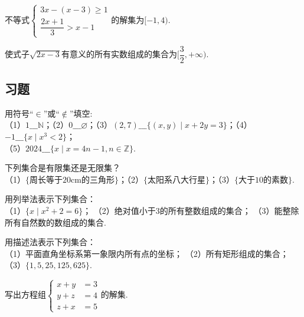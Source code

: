 \documentclass[lang=cn,math=cm,chinesefont=nofont,11pt,scheme=chinese,twocol]{elegantbook}
\begin{document}
\begin{example}
  不等式$\begin{cases}3x-(x-3)\geqslant1\\\dfrac{2x+1}{3}>x-1\end{cases}$的解集为$[-1,4)$.
\end{example}

\begin{example}
  使式子$\sqrt{2x-3}$有意义的所有实数组成的集合为$[\dfrac{3}{2},+\infty)$.
\end{example}

\subsection{习题}

\begin{exercise}\label{exer:1}
  用符号“$\in$”或“$\notin$”填空:\\
（1）$1\_\_\_\mathbb{N}$；（2）$0\_\_\_\varnothing$；（3）$(2,7)\_\_\_\{(x,y)\mid x+2y=3\}$；（4）$-1\_\_\_\{x\mid x^{3}<2\}$；\\（5）$2024\_\_\_\{x\mid x=4n-1,n\in\mathbb{Z}\}$.
\end{exercise}

\begin{exercise}\label{exer:2}
  下列集合是有限集还是无限集？\\
  （1）$\{\text{周长等于20cm的三角形}\}$；（2）$\{\text{太阳系八大行星}\}$；（3）$\{\text{大于10的素数}\}$.
\end{exercise}

\begin{exercise}\label{exer:3}
  用列举法表示下列集合：\\
  （1）$\{x\mid x^2+2=6\}$；
  （2）绝对值小于3的所有整数组成的集合；
  （3）能整除所有自然数的数组成的集合.
\end{exercise}

\begin{exercise}\label{exer:4}
  用描述法表示下列集合：\\
  （1）平面直角坐标系第一象限内所有点的坐标；
  （2）所有矩形组成的集合；
  （3）$\{1,5,25,125,625\}$.
\end{exercise}

\begin{exercise}\label{exer:5}
  写出方程组$\left.\left\{\begin{aligned}x+y&=3\\y+z&=4\\z+x&=5\end{aligned}\right.\right.$的解集.
\end{exercise}
\end{document}
